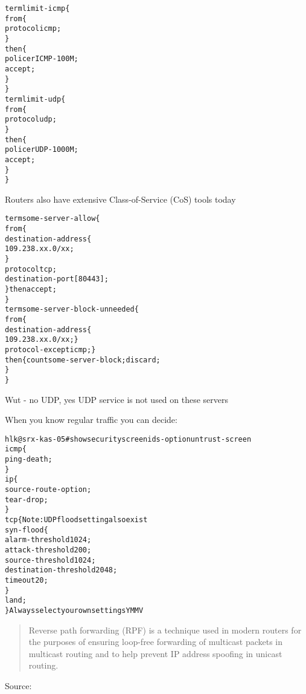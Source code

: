 \documentclass[Screen16to9,17pt]{foils}
\begin{document}

\begin{alltt}\footnotesize
term limit-icmp \{
    from \{
        protocol icmp;
    \}
    then \{
        policer ICMP-100M;
        accept;
    \}
\}
term limit-udp \{
    from \{
        protocol udp;
    \}
    then \{
        policer UDP-1000M;
        accept;
    \}
\}
\end{alltt}

Routers also have extensive Class-of-Service (CoS) tools today


\begin{alltt}\footnotesize
term some-server-allow \{
    from \{
        destination-address \{
            109.238.xx.0/xx;
        \}
        protocol tcp;
        destination-port [ 80 443 ];
    \} then accept;
\}
term some-server-block-unneeded \{
    from \{
        destination-address \{
            109.238.xx.0/xx; \}
        protocol-except icmp;  \}
    then \{ count some-server-block; discard;
    \}
\}
\end{alltt}

Wut - no UDP, yes UDP service is not used on these servers



When you know regular traffic you can decide:

\begin{alltt}\footnotesize
hlk@srx-kas-05# show security screen ids-option untrust-screen
icmp \{
    ping-death;
\}
ip \{
    source-route-option;
    tear-drop;
\}
tcp \{    Note: UDP flood setting also exist
    syn-flood \{
        alarm-threshold 1024;
        attack-threshold 200;
        source-threshold 1024;
        destination-threshold 2048;
        timeout 20;
    \}
    land;
\} Always select your own settings YMMV
\end{alltt}



\begin{quote}
Reverse path forwarding (RPF) is a technique used in modern routers for the purposes of ensuring loop-free forwarding of multicast packets in multicast routing and to help prevent IP address spoofing in unicast routing.
\end{quote}
Source: 
\end{document}
